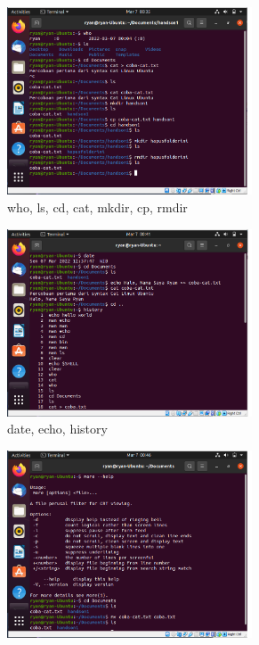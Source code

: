 \documentclass[11pt,a4paper]{article}
\begin{document}
\begin{figure}[h]
	\centering
	\begin{subfigure}[b]{0.4\textwidth}
		\centering
		\def\svgwidth{\columnwidth}
		\includegraphics[width=0.8\textwidth]{Gambar/tut 1.4.1 echo-shell.png}
		\caption{who, ls, cd, cat, mkdir, cp, rmdir}
		\label{fig:aug-1}
	\end{subfigure}
	\qquad
	\begin{subfigure}[b]{0.4\textwidth}
		\centering
		\def\svgwidth{\columnwidth}
		\includegraphics[width=0.8\textwidth]{Gambar/tut 1.4.2 echo-shell.png}
		\caption{date, echo, history}
		\label{fig:aug-2}
	\end{subfigure}
	\begin{subfigure}[b]{0.4\textwidth}
		\centering
		\def\svgwidth{\columnwidth}
		\includegraphics[width=0.8\textwidth]{Gambar/tut 1.4.3 echo-shell.png}

\end{subfigure}
\end{figure}
\end{document}
